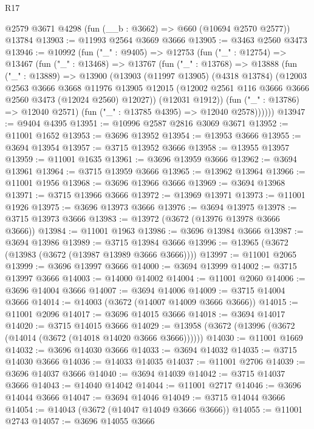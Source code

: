 \begin{lexlean}{R17}
\begin{coremodule}
    @2579
    @3671
    @4298
    (fun (__b : @3662) => @660 (@10694 @2570 @2577))
    @13784
@13903 := @11993 @2564 @3669 @3666
@13905 := @3463 @2560 @3473
@13946 := @10992
    (fun ("_" : @9405) =>
    @12753
      (fun ("_" : @12754) =>
      @13467
        (fun ("_" : @13468) =>
        @13767
          (fun ("_" : @13768) =>
          @13888
            (fun ("_" : @13889) =>
            @13900
              (@13903
                (@11997 @13905)
                (@4318 @13784)
                (@12003
                  @2563
                  @3666
                  @3668
                  @11976
                  @13905
                  @12015
                  (@12002 @2561 @116 @3666 @3666 @2560 @3473 (@12024 @2560) @12027))
                (@12031 @1912))
              (fun ("_" : @13786) => @12040 @2571)
              (fun ("_" : @13785 @4395) => @12040 @2578))))))
@13947 := @9404 @4395
@13951 := @10996 @2587 @2816 @3069 @3671
@13952 := @11001 @1652
@13953 := @3696 @13952
@13954 := @13953 @3666
@13955 := @3694 @13954
@13957 := @3715 @13952 @3666
@13958 := @13955 @13957
@13959 := @11001 @1635
@13961 := @3696 @13959 @3666
@13962 := @3694 @13961
@13964 := @3715 @13959 @3666
@13965 := @13962 @13964
@13966 := @11001 @1956
@13968 := @3696 @13966 @3666
@13969 := @3694 @13968
@13971 := @3715 @13966 @3666
@13972 := @13969 @13971
@13973 := @11001 @1926
@13975 := @3696 @13973 @3666
@13976 := @3694 @13975
@13978 := @3715 @13973 @3666
@13983 := @13972 (@3672 (@13976 @13978 @3666 @3666))
@13984 := @11001 @1963
@13986 := @3696 @13984 @3666
@13987 := @3694 @13986
@13989 := @3715 @13984 @3666
@13996 := @13965 (@3672 (@13983 (@3672 (@13987 @13989 @3666 @3666))))
@13997 := @11001 @2065
@13999 := @3696 @13997 @3666
@14000 := @3694 @13999
@14002 := @3715 @13997 @3666
@14003 := @14000 @14002
@14004 := @11001 @2060
@14006 := @3696 @14004 @3666
@14007 := @3694 @14006
@14009 := @3715 @14004 @3666
@14014 := @14003 (@3672 (@14007 @14009 @3666 @3666))
@14015 := @11001 @2096
@14017 := @3696 @14015 @3666
@14018 := @3694 @14017
@14020 := @3715 @14015 @3666
@14029 := @13958 (@3672 (@13996 (@3672 (@14014 (@3672 (@14018 @14020 @3666 @3666))))))
@14030 := @11001 @1669
@14032 := @3696 @14030 @3666
@14033 := @3694 @14032
@14035 := @3715 @14030 @3666
@14036 := @14033 @14035
@14037 := @11001 @2706
@14039 := @3696 @14037 @3666
@14040 := @3694 @14039
@14042 := @3715 @14037 @3666
@14043 := @14040 @14042
@14044 := @11001 @2717
@14046 := @3696 @14044 @3666
@14047 := @3694 @14046
@14049 := @3715 @14044 @3666
@14054 := @14043 (@3672 (@14047 @14049 @3666 @3666))
@14055 := @11001 @2743
@14057 := @3696 @14055 @3666

\end{coremodule}
\end{lexlean}
